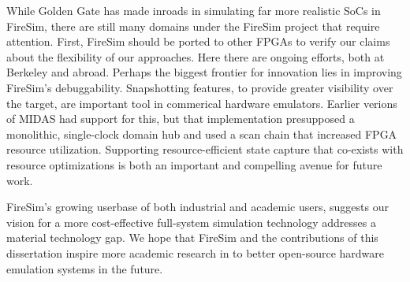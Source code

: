 While Golden Gate has made inroads in simulating far more realistic SoCs in
FireSim, there are still many domains under the FireSim project that require
attention.  First, FireSim should be ported to other FPGAs to verify our claims
about the flexibility of our approaches. Here there are ongoing efforts, both
at Berkeley and abroad. Perhaps the biggest frontier for innovation lies in
improving FireSim's debuggability. Snapshotting features, to provide greater
visibility over the target, are important tool in commerical hardware
emulators. Earlier verions of MIDAS had support for this, but that
implementation presupposed a monolithic, single-clock domain hub and used a
scan chain that increased FPGA resource utilization.  Supporting
resource-efficient state capture that co-exists with resource optimizations is
both an important and compelling avenue for future work.

FireSim's growing userbase of both industrial and academic users, suggests our
vision for a more cost-effective full-system simulation technology addresses a
material technology gap. We hope that FireSim and the contributions of this
dissertation inspire more academic research in to better open-source hardware
emulation systems in the future.
